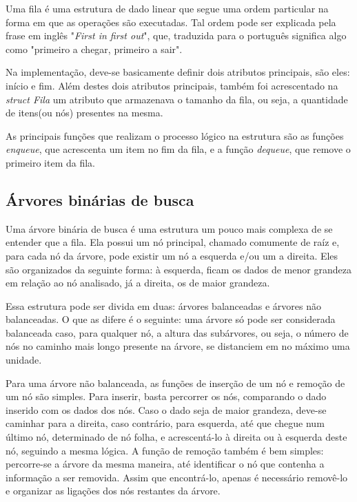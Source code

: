\documentclass[12pt]{article}
\begin{document}
	Uma fila é uma estrutura de dado linear que segue uma ordem particular na forma em que as operações são executadas. Tal ordem pode ser explicada pela frase em inglês "\textit{First in first out}", que, traduzida para o português significa algo como "primeiro a chegar, primeiro a sair".
		
	Na implementação, deve-se basicamente definir dois atributos principais, são eles: início e fim. Além destes dois atributos principais, também foi acrescentado na \textit{struct Fila} um atributo que armazenava o tamanho da fila, ou seja, a quantidade de itens(ou nós) presentes na mesma.
		
	As principais funções que realizam o processo lógico na estrutura são as funções \textit{enqueue}, que acrescenta um item no fim da fila, e a função \textit{dequeue}, que remove o primeiro item da fila.
		
	\subsection{Árvores binárias de busca}
		
	Uma árvore binária de busca é uma estrutura um pouco mais complexa de se entender que a fila. Ela possui um nó principal, chamado comumente de raíz e, para cada nó da árvore, pode existir um nó a esquerda e/ou um a direita. Eles são organizados da seguinte forma: à esquerda, ficam os dados de menor grandeza em relação ao nó analisado, já a direita, os de maior grandeza.
	
	Essa estrutura pode ser divida em duas: árvores balanceadas e árvores não balanceadas. O que as difere é o seguinte: uma árvore só pode ser considerada balanceada caso, para qualquer nó, a altura das subárvores, ou seja, o número de nós no caminho mais longo presente na árvore, se distanciem em no máximo uma unidade.
	
	Para uma árvore não balanceada, as funções de inserção de um nó e remoção de um nó são simples. Para inserir, basta percorrer os nós, comparando o dado inserido com os dados dos nós. Caso o dado seja de maior grandeza, deve-se caminhar para a direita, caso contrário, para esquerda, até que chegue num último nó, determinado de nó folha, e acrescentá-lo à direita ou à esquerda deste nó, seguindo a mesma lógica. A função de remoção também é bem simples: percorre-se a árvore da mesma maneira, até identificar o nó que contenha a informação a ser removida. Assim que encontrá-lo, apenas é necessário removê-lo e organizar as ligações dos nós restantes da árvore.
	
\end{document}
